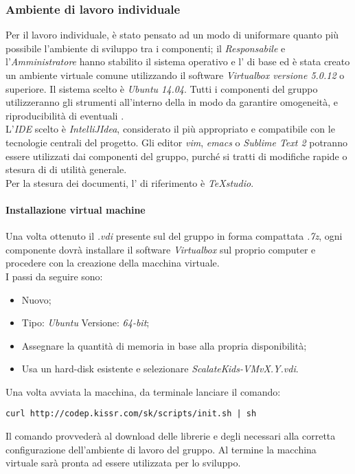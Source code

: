 \documentclass{scalatekids-article}
\begin{document}
\subsubsection{Ambiente di lavoro individuale}

Per il lavoro individuale, è stato pensato ad un modo di uniformare quanto più
possibile l'ambiente di sviluppo tra i componenti; il \textit{Responsabile} e
l'\textit{Amministratore} hanno stabilito il sistema operativo e l' di base ed è stata creato
un ambiente virtuale comune utilizzando il software \textit{Virtualbox versione 5.0.12} o superiore. Il sistema scelto è \textit{Ubuntu 14.04}.
Tutti i componenti del gruppo utilizzeranno gli strumenti all'interno della
 in modo da garantire omogeneità, e riproducibilità di
eventuali .\\ L'\textit{IDE} scelto è \textit{IntelliJIdea}, considerato il
più appropriato e compatibile con le tecnologie centrali del progetto. Gli
editor \textit{vim}, \textit{emacs} o \textit{Sublime Text 2} potranno essere
utilizzati dai componenti del gruppo, purché si tratti di modifiche rapide o
stesura di  di utilità generale.\\
Per la stesura dei documenti, l' di riferimento è \textit{TeXstudio}.

\paragraph{Installazione virtual machine}

\label{sec:MacchinaVirtuale}
Una volta ottenuto il  \textit{.vdi} presente sul  del gruppo
in forma compattata \textit{.7z}, ogni componente dovrà installare il software
\textit{Virtualbox} sul proprio computer e procedere con la creazione della
macchina virtuale.\\
I passi da seguire sono:
\begin{itemize}
\item Nuovo;
\item Tipo: \textit{Ubuntu} Versione: \textit{64-bit};
\item Assegnare la quantità di memoria in base alla propria disponibilità;
\item Usa un hard-disk esistente e selezionare \textit{ScalateKids-VMvX.Y.vdi}.
\end{itemize}
Una volta avviata la macchina, da terminale lanciare il comando:
\begin{center}
  \verb=curl http://codep.kissr.com/sk/scripts/init.sh | sh=
\end{center}
Il comando provvederà al download delle librerie e degli 
necessari alla corretta configurazione dell'ambiente di lavoro del gruppo.
Al termine la macchina virtuale sarà pronta ad essere utilizzata per lo sviluppo.
\end{document}
